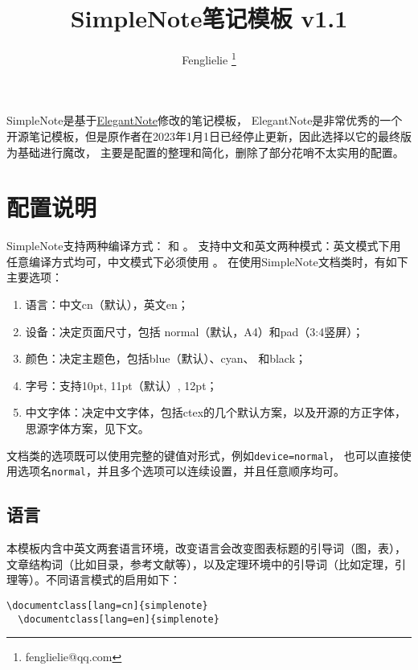 \documentclass[cnfont=NotoCJK]{../simplenote}
\title{SimpleNote笔记模板 v1.1}
\author{Fenglielie \thanks{fenglielie@qq.com}}
\date{\zhtoday}
\begin{document}
\maketitle

SimpleNote是基于\href{https://github.com/ElegantLaTeX/ElegantNote}{ElegantNote}修改的笔记模板，
ElegantNote是非常优秀的一个开源笔记模板，但是原作者在2023年1月1日已经停止更新，因此选择以它的最终版为基础进行魔改，
主要是配置的整理和简化，删除了部分花哨不太实用的配置。


\section{配置说明}

SimpleNote支持两种编译方式： 和 。
支持中文和英文两种模式：英文模式下用任意编译方式均可，中文模式下必须使用 。
在使用SimpleNote文档类时，有如下主要选项：

\begin{enumerate}
    \item 语言：中文cn（默认），英文en；
    \item 设备：决定页面尺寸，包括 normal（默认，A4）和pad（3:4竖屏）；
    \item 颜色：决定主题色，包括\textcolor{eblue}{blue}（默认）、\textcolor{ecyan}{cyan}、 和\textcolor{eblack}{black}；
    \item 字号：支持10pt, 11pt（默认）, 12pt；
    \item 中文字体：决定中文字体，包括ctex的几个默认方案，以及开源的方正字体，思源字体方案，见下文。
\end{enumerate}



\begin{remark}
    文档类的选项既可以使用完整的键值对形式，例如\lstinline{device=normal}，
    也可以直接使用选项名\lstinline{normal}，并且多个选项可以连续设置，并且任意顺序均可。
\end{remark}

\subsection{语言}

本模板内含中英文两套语言环境，改变语言会改变图表标题的引导词（图，表），文章结构词（比如目录，参考文献等），以及定理环境中的引导词（比如定理，引理等）。不同语言模式的启用如下：
\begin{lstlisting}[frame=single]
  \documentclass[lang=cn]{simplenote}
  \documentclass[lang=en]{simplenote}
\end{lstlisting}
\end{document}
